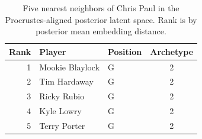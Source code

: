 \begin{table}[htbp]
  \centering\small
  \begin{tabular}{rllc}
    \toprule
    Rank & Player & Position & Archetype \\
    \midrule
    1 & Mookie Blaylock & G & 2 \\
    2 & Tim Hardaway & G & 2 \\
    3 & Ricky Rubio & G & 2 \\
    4 & Kyle Lowry & G & 2 \\
    5 & Terry Porter & G & 2 \\
    \bottomrule
  \end{tabular}
  \caption{Five nearest neighbors of Chris Paul in the Procrustes-aligned posterior latent space. Rank is by posterior mean embedding distance.}
  \label{tab:Chris_Paul_neighbors}
\end{table}

